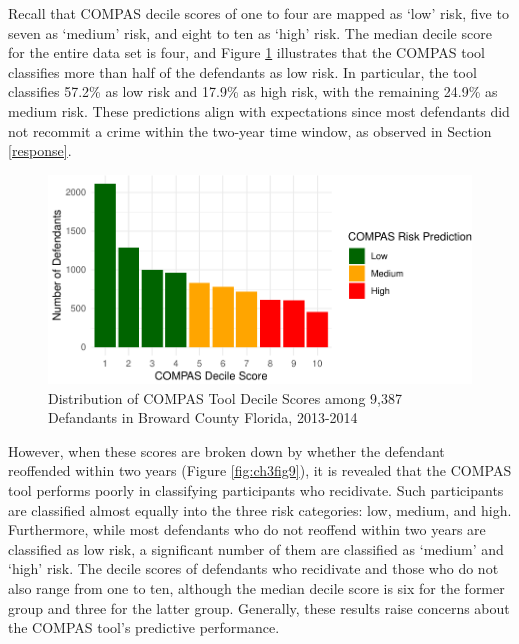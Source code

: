 \documentclass[12pt, twoside]{amherstthesis}
\begin{document}
Recall that COMPAS decile scores of one to four are mapped as `low' risk, five to seven as `medium' risk, and eight to ten as `high' risk. The median decile score for the entire data set is four, and Figure \ref{fig:ch3fig8} illustrates that the COMPAS tool classifies more than half of the defendants as low risk. In particular, the tool classifies 57.2\% as low risk and 17.9\% as high risk, with the remaining 24.9\% as medium risk. These predictions align with expectations since most defendants did not recommit a crime within the two-year time window, as observed in Section \ref{response}.
\begin{figure}

{\centering \includegraphics{Dasha-Asienga_StatThesis_files/figure-latex/ch3fig8-1} 

}

\caption{Distribution of COMPAS Tool Decile Scores among 9,387 Defandants in Broward County Florida, 2013-2014}\label{fig:ch3fig8}
\end{figure}
However, when these scores are broken down by whether the defendant reoffended within two years (Figure \ref{fig:ch3fig9}), it is revealed that the COMPAS tool performs poorly in classifying participants who recidivate. Such participants are classified almost equally into the three risk categories: low, medium, and high. Furthermore, while most defendants who do not reoffend within two years are classified as low risk, a significant number of them are classified as `medium' and `high' risk. The decile scores of defendants who recidivate and those who do not also range from one to ten, although the median decile score is six for the former group and three for the latter group. Generally, these results raise concerns about the COMPAS tool's predictive performance.
\end{document}

